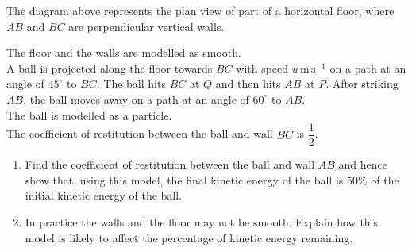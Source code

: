 \documentclass[leqno]{article}
\begin{document}
\begin{enumerate}[
  label=\textbf{\arabic*.},
  leftmargin=*,
  topsep=0pt,
  partopsep=0pt,
  parsep=0pt
]
\begin{figure}[H]
\end{figure}


The diagram above represents the plan view of part of a horizontal floor, where $AB$ and $BC$ are perpendicular vertical walls.

The floor and the walls are modelled as smooth. \\

A ball is projected along the floor towards $BC$ with speed $u\,\mathrm{m\,s^{-1}}$ on a path at an angle of $45^\circ$ to $BC$. The ball hits $BC$ at $Q$ and then hits $AB$ at $P$. After striking $AB$, the ball moves away on a path at an angle of $60^\circ$ to $AB$. \\

The ball is modelled as a particle. \\

The coefficient of restitution between the ball and wall $BC$ is $\dfrac{1}{2}$. \\

\begin{enumerate}[label=\textbf{(\alph*)}]
  \item Find the coefficient of restitution between the ball and wall $AB$ and hence show that, using this model, the final kinetic energy of the ball is $50\%$ of the initial kinetic energy of the ball.  \\
  \item In practice the walls and the floor may not be smooth. Explain how this model is likely to affect the percentage of kinetic energy remaining.  \\
\end{enumerate}


\end{enumerate}
\end{document}
